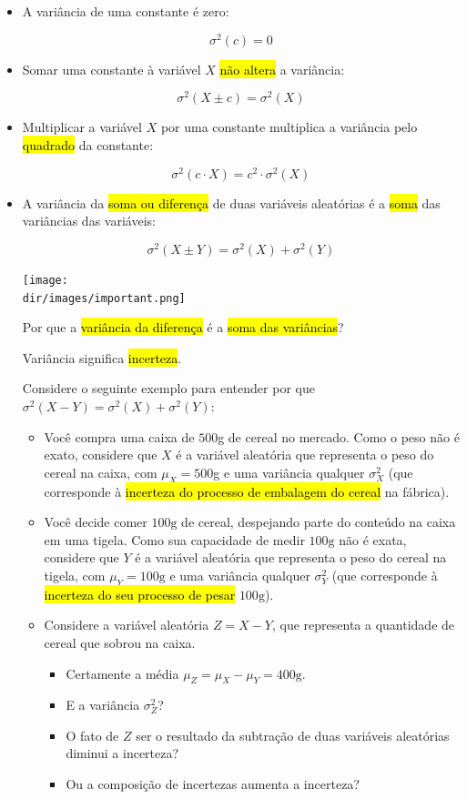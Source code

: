 \documentclass[
  11pt]{report}
\newcommand{\dir}{/ssd/R/x86_64-pc-linux-gnu-library/4.3/fnaufelRmd/rmarkdown/resources}
\newenvironment{rmdimportant}
{
  \begin{myimportant}
    \texttt{[image: \\dir/images/important.png]}
    \tcblower
  }
  {
  \end{myimportant}
}
\begin{document}
\begin{itemize}
\item
  A variância de uma constante é zero:

  \[
  \sigma^2(c) = 0
  \]
\item
  Somar uma constante à variável $X$ {\hl{não altera}} a variância:

  \[
  \sigma^2(X \pm c) = \sigma^2(X)
  \]
\item
  Multiplicar a variável $X$ por uma constante multiplica a variância pelo {\hl{quadrado}} da constante:

  \[
  \sigma^2(c \cdot X) = c^2 \cdot \sigma^2(X)
  \]
\item
  A variância da {\hl{soma ou diferença}} de duas variáveis aleatórias é a {\hl{soma}} das variâncias das variáveis:

  \[
  \sigma^2(X \pm Y) = \sigma^2(X) + \sigma^2(Y)
  \]

  \begin{rmdimportant}

  Por que a {\hl{variância da diferença}} é a {\hl{soma das variâncias}}?

  Variância significa {\hl{incerteza}}.

  Considere o seguinte exemplo para entender por que $\sigma^2(X - Y) = \sigma^2(X) + \sigma^2(Y)$:

  \begin{itemize}
  \item
    Você compra uma caixa de $500$g de cereal no mercado. Como o peso não é exato, considere que $X$ é a variável aleatória que representa o peso do cereal na caixa, com $\mu_X = 500$g e uma variância qualquer $\sigma^2_X$ (que corresponde à {\hl{incerteza do processo de embalagem do cereal}} na fábrica).
  \item
    Você decide comer $100\text{g}$ de cereal, despejando parte do conteúdo na caixa em uma tigela. Como sua capacidade de medir $100\text{g}$ não é exata, considere que $Y$ é a variável aleatória que representa o peso do cereal na tigela, com $\mu_Y = 100\text{g}$ e uma variância qualquer $\sigma^2_Y$ (que corresponde à {\hl{incerteza do seu processo de pesar}} $100\text{g}$).
  \item
    Considere a variável aleatória $Z = X - Y$, que representa a quantidade de cereal que sobrou na caixa.

    \begin{itemize}
    \item
      Certamente a média $\mu_Z = \mu_X - \mu_Y = 400\text{g}$.
    \item
      E a variância $\sigma^2_Z$?
    \item
      O fato de $Z$ ser o resultado da subtração de duas variáveis aleatórias diminui a incerteza?
    \item
      Ou a composição de incertezas aumenta a incerteza?
    \end{itemize}
  \end{itemize}

  \end{rmdimportant}
\end{itemize}
\end{document}
